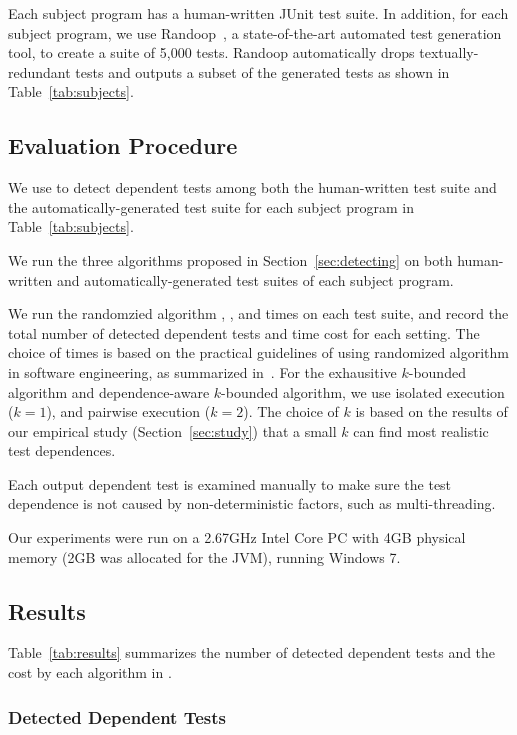 Each subject program has a human-written JUnit test suite.
In addition, for each subject program, we use
Randoop~\cite{PachecoLET2007}, a state-of-the-art automated
test generation tool, to create a suite of 5,000 tests.
Randoop automatically drops textually-redundant tests 
and outputs a subset of the generated tests as
shown in Table~\ref{tab:subjects}.


\subsection{Evaluation Procedure}

We use \ourtool to detect dependent
tests among both the human-written test suite 
and the automatically-generated test suite
for each subject program in Table~\ref{tab:subjects}.

We run the three algorithms proposed
in Section~\ref{sec:detecting} on both
human-written and automatically-generated test suites
of each subject program.

We run the randomzied algorithm \smalltrialnum, \mediumtrialnum,
and \trialnum times on each test suite, and record
the total number of detected dependent tests and time cost
for each setting. The choice of \trialnum times is based
on the practical guidelines of using randomized algorithm
in software engineering, as summarized in~\cite{Arcuri:2011}.
%
For the exhausitive $k$-bounded algorithm
and dependence-aware $k$-bounded algorithm,
we use isolated execution ($k = 1$), and
pairwise execution ($k = 2$). The choice of $k$ is
based on the results of our empirical
study (Section~\ref{sec:study}) that a small $k$
can find most realistic test dependences.


Each output dependent test is examined manually to make
sure the test dependence is not caused by non-deterministic
factors, such as multi-threading.

Our experiments were run on a 2.67GHz Intel Core PC
with 4GB physical memory (2GB was allocated for the JVM),
running Windows 7.

\subsection{Results}

Table~\ref{tab:results} summarizes the number of detected
dependent tests and the cost by each algorithm
in \ourtool.

\subsubsection{Detected Dependent Tests}
\label{sec:detectedtests}

